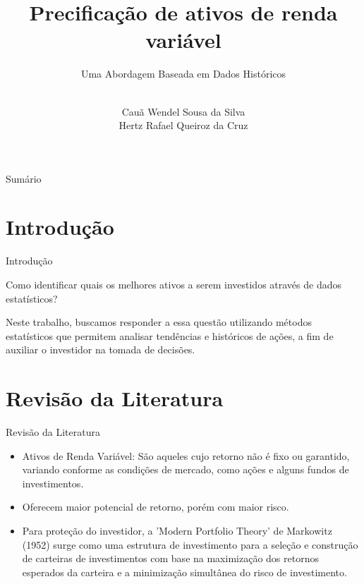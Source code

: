 \documentclass[aspectratio=169]{beamer}
\title{Precificação de ativos de renda variável}
\subtitle{Uma Abordagem Baseada em Dados Históricos}
\author{\\Cauã Wendel Sousa da Silva \\ Hertz Rafael Queiroz da Cruz}
\begin{document}
\begin{frame}
  \maketitle
\end{frame}


\begin{frame}{Sumário}
  \tableofcontents
\end{frame}

\section{Introdução}
\begin{frame}{Introdução}

  \begin{center}
    {\Large Como identificar quais os melhores ativos a serem investidos através de dados estatísticos?}

    
  \end{center}

  \vspace{0.5cm}
Neste trabalho, buscamos responder a essa questão utilizando métodos estatísticos que permitem analisar tendências e históricos de ações, a fim de auxiliar o investidor na tomada de decisões.


  
\end{frame}

\section{Revisão da Literatura}
\begin{frame}{Revisão da Literatura}
  \begin{itemize}
    \item Ativos de Renda Variável: São aqueles cujo retorno não é fixo ou garantido, variando conforme as condições de mercado, como ações e alguns fundos de investimentos.

    \item Oferecem maior potencial de retorno, porém com maior risco.

    \item Para proteção do investidor, a 'Modern Portfolio Theory'
    de Markowitz (1952) surge como uma estrutura de investimento para a seleção e
    construção de carteiras de investimentos com base na maximização dos retornos esperados da carteira e a minimização simultânea do risco de investimento. \cite{mangram2013simplified}

  \end{itemize}
\end{frame}
\end{document}
